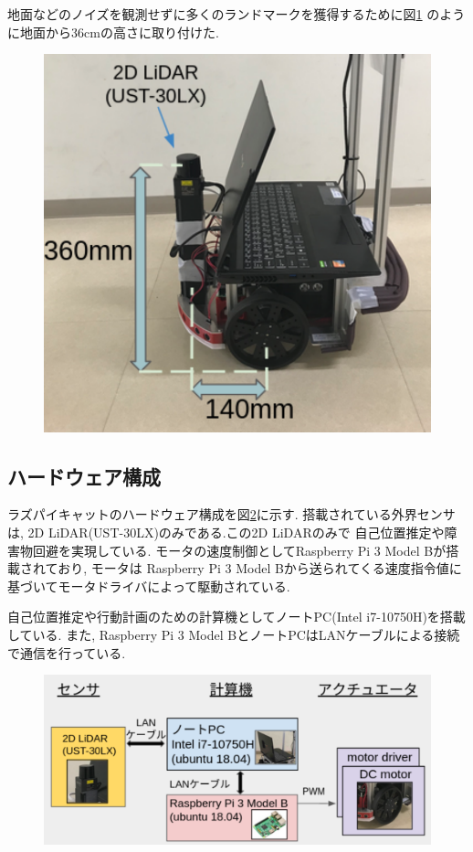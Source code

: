 地面などのノイズを観測せずに多くのランドマークを獲得するために図\ref{fig:raspicat-lidar}
のように地面から36cmの高さに取り付けた.

\begin{figure}[h]
	\begin{center}
		\includegraphics[width=0.5\linewidth]{figs/raspicat-lidar.pdf}
		\caption{}
		\label{fig:raspicat-lidar}
	\end{center}
\end{figure}

\subsection{ハードウェア構成}
ラズパイキャットのハードウェア構成を図\ref{fig:raspicat-hardware-config}に示す. 
搭載されている外界センサは, 2D LiDAR(UST-30LX)のみである.この2D LiDARのみで
自己位置推定や障害物回避を実現している. 
モータの速度制御としてRaspberry Pi 3 Model Bが搭載されており, モータは
Raspberry Pi 3 Model Bから送られてくる速度指令値に基づいてモータドライバによって駆動されている.

自己位置推定や行動計画のための計算機としてノートPC(Intel i7-10750H)を搭載している.
また, Raspberry Pi 3 Model BとノートPCはLANケーブルによる接続で通信を行っている.

\begin{figure}[h]
	\begin{center}
		\includegraphics[width=1.0\linewidth]{figs/raspicat-hardware-config.pdf}
		\caption{}
		\label{fig:raspicat-hardware-config}
	\end{center}
\end{figure}

